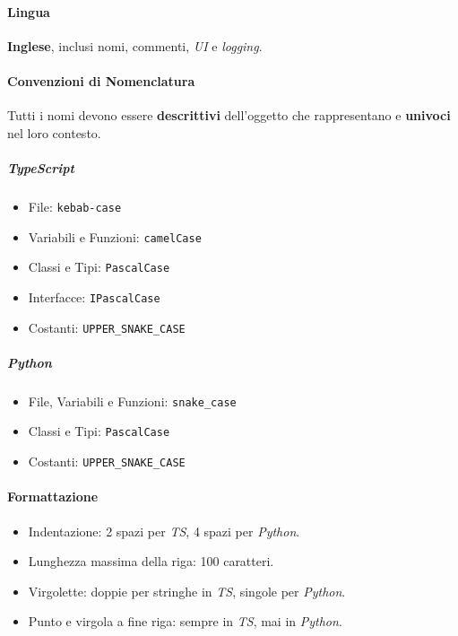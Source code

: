 \documentclass[12pt, a4paper]{article}
\newcommand{\urlglossario}{https://skynetunigroup.github.io/Code_Guardian/Documentazione/RTB/glossario_v1.0.0.pdf} %
\newcommand{\glo}[2]{\href{\urlglossario\#nameddest=#2}{#1\textsubscript{G}}}
\begin{document}

\paragraph{Lingua} \textbf{Inglese}, inclusi nomi, commenti, \textit{UI} e \textit{logging}.

\paragraph{Convenzioni di Nomenclatura} Tutti i nomi devono essere \textbf{descrittivi} dell'oggetto che rappresentano e \textbf{univoci} nel loro contesto.

\subparagraph{\textit{TypeScript}}
\begin{itemize}
    \item File: \texttt{kebab-case}
    \item Variabili e Funzioni: \texttt{camelCase}
    \item Classi e Tipi: \texttt{PascalCase}
    \item Interfacce: \texttt{IPascalCase}
    \item Costanti: \texttt{UPPER\_SNAKE\_CASE}
\end{itemize}

\subparagraph{\textit{Python}}
\begin{itemize}
    \item File, Variabili e Funzioni: \texttt{snake\_case}
    \item Classi e Tipi: \texttt{PascalCase}
    \item Costanti: \texttt{UPPER\_SNAKE\_CASE}
\end{itemize}

\paragraph{Formattazione}
\begin{itemize}
    \item Indentazione: 2 spazi per \textit{TS}, 4 spazi per \textit{Python}.
    \item Lunghezza massima della riga: 100 caratteri.
    \item Virgolette: doppie per stringhe in \textit{TS}, singole per \textit{Python}.
    \item Punto e virgola a fine riga: sempre in \textit{TS}, mai in \textit{Python}.
\end{itemize}
\end{document}

